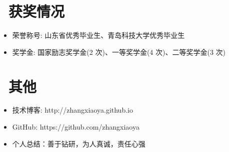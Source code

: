 \documentclass{resume}
\begin{document}
\section{\faHeartO\ 获奖情况}
\begin{itemize}[parsep=0.5ex]
  \item 荣誉称号: 山东省优秀毕业生、青岛科技大学优秀毕业生
  \item 奖学金: 国家励志奖学金(2 次)、一等奖学金(4 次)、二等奖学金(3 次)
\end{itemize}

\section{\faInfo\ 其他}
\begin{itemize}[parsep=0.5ex]
  \item 技术博客: http://zhangxiaoya.github.io
  \item GitHub: https://github.com/zhangxiaoya
  \item 个人总结：善于钻研，为人真诚，责任心强
\end{itemize}
\end{document}
